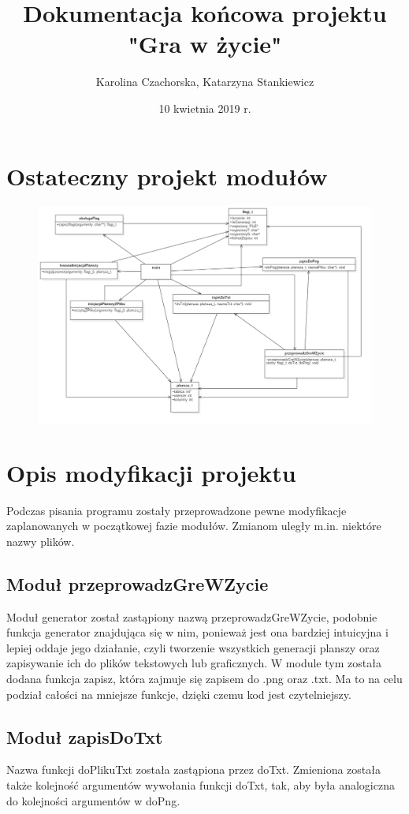 \documentclass[10pt, oneside]{article}
\title{Dokumentacja końcowa projektu "Gra w życie"}
\author{Karolina Czachorska, Katarzyna Stankiewicz}
\date{10 kwietnia 2019 r.}
\begin{document}
\maketitle
\tableofcontents
\newpage	
\section{Ostateczny projekt modułów}

 
\begin{figure}[H]
	\centering
	\includegraphics[width=13cm]{Main.png}
\end{figure}

\section{Opis modyfikacji projektu}
Podczas pisania programu zostały przeprowadzone pewne modyfikacje zaplanowanych w początkowej fazie modułów. Zmianom uległy m.in. niektóre nazwy plików. 

\subsection{Moduł przeprowadzGreWZycie}
Moduł generator został zastąpiony nazwą przeprowadzGreWZycie, podobnie funkcja generator znajdująca się w nim, ponieważ jest ona bardziej intuicyjna i lepiej oddaje jego działanie, czyli tworzenie wszystkich generacji planszy oraz zapisywanie ich do plików tekstowych lub graficznych. W module tym została dodana funkcja zapisz, która zajmuje się zapisem do .png oraz .txt. Ma to na celu podział całości na mniejsze funkcje, dzięki czemu kod jest czytelniejszy. 
\subsection{Moduł zapisDoTxt}
Nazwa funkcji doPlikuTxt została zastąpiona przez doTxt. Zmieniona została także kolejność argumentów wywołania funkcji doTxt, tak, aby była analogiczna do kolejności argumentów w doPng. 
\end{document}
